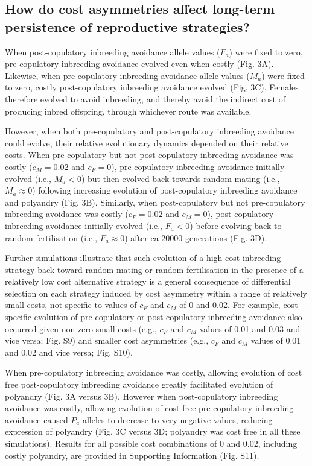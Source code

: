 \documentclass[12pt]{article}
\begin{document}
\subsection*{How do cost asymmetries affect long-term persistence of reproductive strategies?}

When post-copulatory inbreeding avoidance allele values ($F_{a}$) were fixed to zero, pre-copulatory inbreeding avoidance evolved even when costly (Fig. 3A). Likewise, when pre-copulatory inbreeding avoidance allele values ($M_{a}$) were fixed to zero, costly post-copulatory inbreeding avoidance evolved (Fig. 3C). Females therefore evolved to avoid inbreeding, and thereby avoid the indirect cost of producing inbred offspring, through whichever route was available.

However, when both pre-copulatory and post-copulatory inbreeding avoidance could evolve, their relative evolutionary dynamics depended on their relative costs. When pre-copulatory but not post-copulatory inbreeding avoidance was costly ($c_{M}=0.02$ and $c_{F}=0$), pre-copulatory inbreeding avoidance initially evolved (i.e., $M_{a} < 0$) but then evolved back towards random mating (i.e., $M_{a} \approx 0$) following increasing evolution of post-copulatory inbreeding avoidance and polyandry (Fig. 3B). Similarly, when post-copulatory but not pre-copulatory inbreeding avoidance was costly ($c_{F}=0.02$ and $c_{M}=0$), post-copulatory inbreeding avoidance initially evolved (i.e., $F_{a} < 0$) before evolving back to random fertilisation (i.e., $F_{a} \approx 0$) after ca $20000$ generations (Fig. 3D). 

Further simulations illustrate that such evolution of a high cost inbreeding strategy back toward random mating or random fertilisation in the presence of a relatively low cost alternative strategy is a general consequence of differential selection on each strategy induced by cost asymmetry within a range of relatively small costs, not specific to values of $c_{F}$ and $c_{M}$ of 0 and 0.02. For example, cost-specific evolution of pre-copulatory or post-copulatory inbreeding avoidance also occurred given non-zero small costs (e.g., $c_{F}$ and $c_{M}$ values of 0.01 and 0.03 and vice versa; Fig. S9) and smaller cost asymmetries (e.g., $c_{F}$ and $c_{M}$ values of 0.01 and 0.02 and vice versa; Fig. S10).

When pre-copulatory inbreeding avoidance was costly, allowing evolution of cost free post-copulatory inbreeding avoidance greatly facilitated evolution of polyandry (Fig. 3A versus 3B). However when post-copulatory inbreeding avoidance was costly, allowing evolution of cost free pre-copulatory inbreeding avoidance caused $P_{a}$ alleles to decrease to very negative values, reducing expression of polyandry (Fig. 3C versus 3D; polyandry was cost free in all these simulations). Results for all possible cost combinations of $0$ and $0.02$, including costly polyandry, are provided in Supporting Information (Fig. S11).
\end{document}
